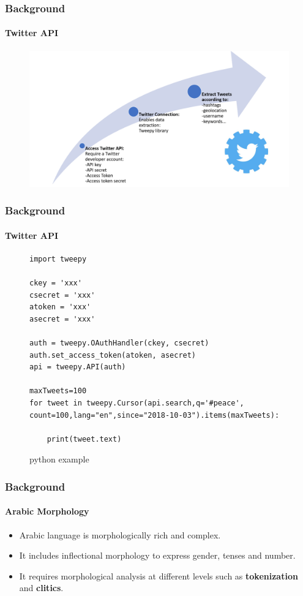 \documentclass[xcolor=table]{beamer}
\begin{document}
\begin{frame}
\frametitle{Background}
\framesubtitle{Twitter API}
\begin{figure}[!htb]
   \centering
    \includegraphics[scale=0.35]{twitter.png}
    
\end{figure}


\end{frame}

\begin{frame}[fragile]
\frametitle{Background}
\framesubtitle{Twitter API}
\begin{figure}
    \lstset{language=Python}
\lstset{frame=lines}
\lstset{basicstyle=\footnotesize}
\begin{lstlisting}
import tweepy

ckey = 'xxx'
csecret = 'xxx'
atoken = 'xxx'
asecret = 'xxx'

auth = tweepy.OAuthHandler(ckey, csecret)
auth.set_access_token(atoken, asecret)
api = tweepy.API(auth)

maxTweets=100
for tweet in tweepy.Cursor(api.search,q='#peace',
count=100,lang="en",since="2018-10-03").items(maxTweets):
	
	print(tweet.text)
\end{lstlisting}
\caption{python example}
\end{figure}


\end{frame}

\begin{frame}
\frametitle{Background}
\framesubtitle{Arabic Morphology}
\begin{itemize}
\item Arabic language is morphologically rich and complex.
\item It includes inflectional morphology to express gender, tenses and number.
\item It requires morphological analysis at different levels such as \textbf{tokenization} and \textbf{clitics}.
\end{itemize}

\end{frame}
\end{document}
